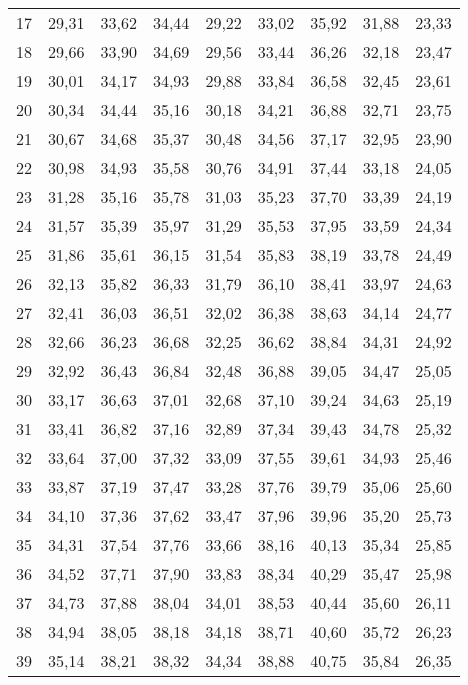 \begin{longtable}{c c c c c c c c c}
      17	& 29,31	& 33,62	& 34,44	& 29,22	& 33,02	& 35,92	& 31,88	& 23,33 \\
      18	& 29,66	& 33,90	& 34,69	& 29,56	& 33,44	& 36,26	& 32,18	& 23,47 \\
      19	& 30,01	& 34,17	& 34,93	& 29,88	& 33,84	& 36,58	& 32,45	& 23,61 \\
      20	& 30,34	& 34,44	& 35,16	& 30,18	& 34,21	& 36,88	& 32,71	& 23,75 \\
      21	& 30,67	& 34,68	& 35,37	& 30,48	& 34,56	& 37,17	& 32,95	& 23,90 \\
      22	& 30,98	& 34,93	& 35,58	& 30,76	& 34,91	& 37,44	& 33,18	& 24,05 \\
      23	& 31,28	& 35,16	& 35,78	& 31,03	& 35,23	& 37,70	& 33,39	& 24,19 \\
      24	& 31,57	& 35,39	& 35,97	& 31,29	& 35,53	& 37,95	& 33,59	& 24,34 \\
      25	& 31,86	& 35,61	& 36,15	& 31,54	& 35,83	& 38,19	& 33,78	& 24,49 \\
      26	& 32,13	& 35,82	& 36,33	& 31,79	& 36,10	& 38,41	& 33,97	& 24,63 \\
      27	& 32,41	& 36,03	& 36,51	& 32,02	& 36,38	& 38,63	& 34,14	& 24,77 \\
      28	& 32,66	& 36,23	& 36,68	& 32,25	& 36,62	& 38,84	& 34,31	& 24,92 \\
      29	& 32,92	& 36,43	& 36,84	& 32,48	& 36,88	& 39,05	& 34,47	& 25,05 \\
      30	& 33,17	& 36,63	& 37,01	& 32,68	& 37,10	& 39,24	& 34,63	& 25,19 \\
      31	& 33,41	& 36,82	& 37,16	& 32,89	& 37,34	& 39,43	& 34,78	& 25,32 \\
      32	& 33,64	& 37,00	& 37,32	& 33,09	& 37,55	& 39,61	& 34,93	& 25,46 \\
      33	& 33,87	& 37,19	& 37,47	& 33,28	& 37,76	& 39,79	& 35,06	& 25,60 \\
      34	& 34,10	& 37,36	& 37,62	& 33,47	& 37,96	& 39,96	& 35,20	& 25,73 \\
      35	& 34,31	& 37,54	& 37,76	& 33,66	& 38,16	& 40,13	& 35,34	& 25,85 \\
      36	& 34,52	& 37,71	& 37,90	& 33,83	& 38,34	& 40,29	& 35,47	& 25,98 \\
      37	& 34,73	& 37,88	& 38,04	& 34,01	& 38,53	& 40,44	& 35,60	& 26,11 \\
      38	& 34,94	& 38,05	& 38,18	& 34,18	& 38,71	& 40,60	& 35,72	& 26,23 \\
      39	& 35,14	& 38,21	& 38,32	& 34,34	& 38,88	& 40,75	& 35,84	& 26,35 \\

\end{longtable}
